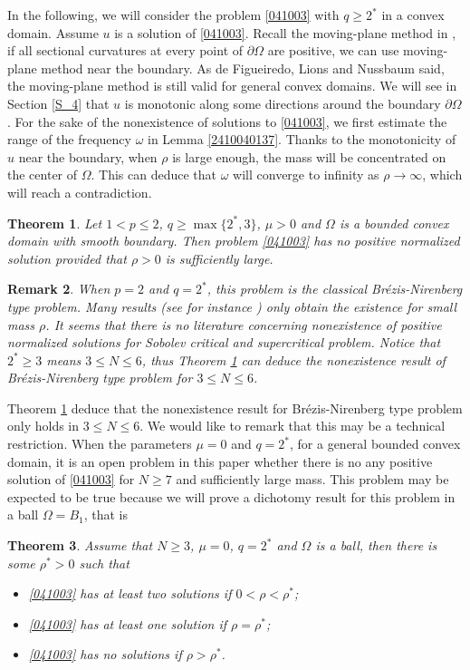 \documentclass[10pt]{article}
\numberwithin{equation}{section}
\newtheorem{theorem}{Theorem}[section]
\newtheorem{remark}[theorem]{Remark}
\numberwithin{equation}{section}
\begin{document}
In the following, we will consider the problem \eqref{041003} with  $q\ge 2^*$ in a convex domain. Assume $u$ is a solution of \eqref{041003}. Recall the moving-plane method in \cite{GNN1979}, if all sectional curvatures at every point of $\partial\Omega$ are positive, we can use moving-plane method near the boundary. As de Figueiredo,  Lions and Nussbaum \cite{dLN1982} said, the moving-plane method is still valid for general convex domains. We will see in Section \ref{S_4} that $u$ is monotonic along some directions around the boundary $\partial\Omega$. For the sake of the nonexistence of solutions to \eqref{041003}, we first estimate the range of the frequency $\omega$ in Lemma \ref{2410040137}. Thanks to the monotonicity of $u$ near the boundary, when $\rho$ is large enough, the mass will be concentrated on the center of $\Omega$. This can deduce that $\omega$ will converge to infinity as $\rho\to\infty$, which will reach a contradiction.
\begin{theorem}\label{T051401}
Let $1<p\le 2$, $q\ge \max\{2^*, 3\}$, $\mu> 0$ and $\Omega$ is a bounded convex domain with smooth boundary. Then problem \eqref{041003} has no positive normalized solution provided that $\rho>0$ is sufficiently large.
\end{theorem}

\begin{remark}
When $p=2$ and $q=2^*$, this problem is the classical Br\'ezis-Nirenberg type problem. Many results (see for instance \cite{Pierotti25, SZarxiv25, CLY2025}) only obtain the existence for small mass $\rho$. It seems that there is no literature concerning nonexistence of positive normalized  solutions for Sobolev critical and supercritical problem. Notice that $2^*\ge 3$ means $3\le N\le 6$, thus Theorem \ref{T051401} can deduce the nonexistence result of Br\'ezis-Nirenberg type problem for $3\le N\le 6$. 
\end{remark}

Theorem \ref{T051401} deduce that the nonexistence result for Br\'ezis-Nirenberg type problem only holds in $3\le N\le 6$. We would like to remark that this may be a technical restriction. When the parameters $\mu= 0$ and $q=2^*$, for a general bounded convex domain, it is an open problem in this paper whether there is no any positive solution of \eqref{041003} for  $N\ge 7$ and sufficiently large mass. This problem may be expected to be true because we will prove a dichotomy result for this problem in a ball $\Omega=B_1$, that is
\begin{theorem}\label{2505261703}
Assume that $N\ge 3$, $\mu=0$, $q=2^*$ and $\Omega$ is a ball, then there is some $\rho^*>0$ such that
\begin{itemize}
\item[\rm (i)] \eqref{041003} has at least two solutions if $0<\rho<\rho^*$;
\item[\rm (ii)] \eqref{041003} has at least one solution if $\rho=\rho^*$;
\item[\rm (iii)] \eqref{041003} has no solutions if $\rho>\rho^*$.
\end{itemize}
\end{theorem}
\end{document}
